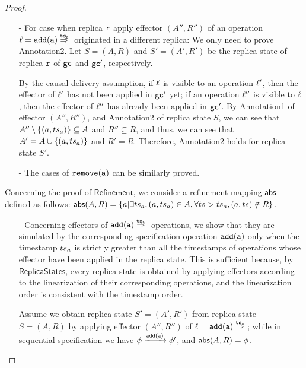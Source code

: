 \begin {proof}
\begin{itemize}
    By Annotatioon2 of replica state $S$, we can see that Annotation1 holds for the effector $(A',R')$, and Annotation2 holds for the replica state $S'$.

\item[-] For case when replica $\mathtt{r}$ apply effector $(A'',R'')$ of an operation $\alabel = \alabellongind[{\tt add}]{a}{}{\ats_a}{}$ originated in a different replica: We only need to prove Annotation2. Let $S=(A,R)$ and $S'=(A',R')$ be the replica state of replica $\mathtt{r}$ of $\mathtt{gc}$ and $\mathtt{gc}'$, respectively.

    By the causal delivery assumption, if $\ell$ is visible to an operation $\ell'$, then the effector of $\ell'$ has not been applied in $\mathtt{gc}'$ yet; if an operation $\ell''$ is visible to $\ell$, then the effector of $\ell''$ has already been applied in $\mathtt{gc}'$. By Annotation1 of effector $(A'',R'')$, and Annotation2 of replica state $S$, we can see that $A'' \setminus \{ (a,ts_a) \} \subseteq A$ and $R'' \subseteq R$, and thus, we can see that $A' = A \cup \{ (a,ts_a) \}$ and $R' = R$. Therefore, Annotation2 holds for replica state $S'$.

\item[-] The cases of $\alabelshort[{\tt remove}]{a}$ can be similarly proved.
\end{itemize}

Concerning the proof of $\mathsf{Refinement}$, we consider a refinement mapping $\mathsf{abs}$ defined as follows: $\mathsf{abs}(A,R) = \{ a \vert \exists ts_a, (a,ts_a) \in A, \forall ts > ts_a, (a,ts) \notin R \}$.

\begin{itemize}
\setlength{\itemsep}{0.5pt}
\item[-] Concerning effectors of $\alabellongind[{\tt add}]{a}{}{\ats_a}{}$ operations, we show that they are simulated by the corresponding specification operation $\alabelshort[{\tt add}]{a}$ only when the timestamp $ts_a$ is strictly greater than all the timestamps of operations whose effector have been applied in the replica state. This is sufficient because, by $\mathsf{ReplicaStates}$, every replica state is obtained by applying effectors according to the linearization of their corresponding operations, and the linearization order is consistent with the timestamp order.

    Assume we obtain replica state $S' = (A',R')$ from replica state $S = (A,R)$ by applying effector $(A'',R'')$ of $\alabel = \alabellongind[{\tt add}]{a}{}{\ats_a}{}$; while in sequential specification we have $\abstate \xrightarrow{\alabelshort[{\tt add}]{a}} \abstate'$, and $\mathsf{abs}(A,R) = \phi$.


\end{itemize}
\end{proof}
